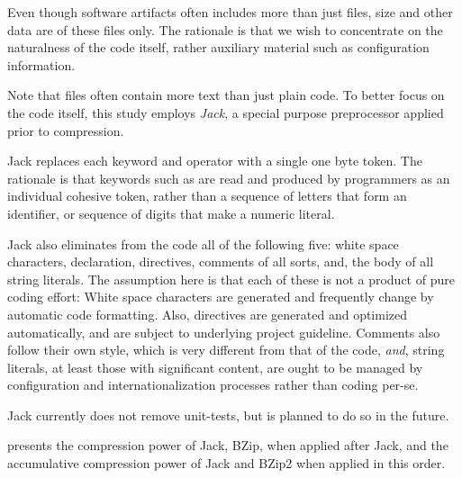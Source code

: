 Even though software artifacts often includes more than just  files,
size and other data are of these files only. The rationale is that we wish to
concentrate on the naturalness of the \Java code itself, rather auxiliary
material such as configuration information.

Note that  files often contain more text than just plain code.  To
better focus on the code itself, this study employs \emph{Jack}, a special
purpose \Java preprocessor applied prior to compression.

Jack replaces each keyword and operator with a single one byte token. The
rationale is that keywords such as  are read and produced by
programmers as an individual cohesive token, rather than a sequence of letters
that form an identifier, or sequence of digits that make a numeric literal.

Jack also eliminates from the \Java code all of the following five: white space
characters,  declaration,  directives, comments of all
sorts, and, the body of all string literals. The assumption here is that each
of these is not a product of pure coding effort: White space characters are
generated and frequently change by automatic code formatting. Also, 
directives are generated and optimized automatically, and are subject to
underlying project guideline. Comments also follow their own style, which is
very different from that of the code, \emph{and}, string literals, at least
those with significant content, are ought to be managed by configuration and
internationalization processes rather than coding per-se.

Jack currently does not remove unit-tests, but is planned to do so in the
future.

 presents the compression power of Jack, BZip, when
applied after Jack, and the accumulative compression power of Jack and BZip2
when applied in this order.

